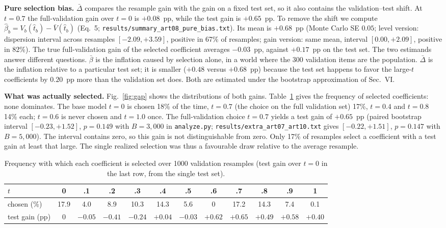 \documentclass[conference]{IEEEtran}
\begin{document}
\textbf{Pure selection bias.} $\bar\Delta$ compares the resample gain with the gain on a fixed test set, so it also contains the validation--test shift. At $t=0.7$ the full-validation gain over $t=0$ is $+0.08$~pp, while the test gain is $+0.65$~pp. To remove the shift we compute $\hat\beta_b=V_b(\hat t_b)-\bar V(\hat t_b)$ (Eq.~5; \texttt{results/summary\_art08\_pure\_bias.txt}). Its mean is $+0.68$~pp (Monte Carlo SE $0.05$; level version: dispersion interval across resamples $[-2.09,+3.59]$, positive in 67\% of resamples; gain version: same mean, interval $[0.00,+2.09]$, positive in 82\%). The true full-validation gain of the selected coefficient averages $-0.03$~pp, against $+0.17$~pp on the test set. The two estimands answer different questions. $\bar\beta$ is the inflation caused by selection alone, in a world where the 300 validation items are the population. $\bar\Delta$ is the inflation relative to a particular test set; it is smaller ($+0.48$ versus $+0.68$~pp) because the test set happens to favor the large-$t$ coefficients by $0.20$~pp more than the validation set does. Both are estimated under the bootstrap approximation of Sec.~VI.

\textbf{What was actually selected.} Fig.~\ref{fig:gap} shows the distributions of both gains. Table~\ref{tab:choice} gives the frequency of selected coefficients: none dominates. The base model $t=0$ is chosen 18\% of the time, $t=0.7$ (the choice on the full validation set) 17\%, $t=0.4$ and $t=0.8$ 14\% each; $t=0.6$ is never chosen and $t=1.0$ once. The full-validation choice $t=0.7$ yields a test gain of $+0.65$~pp (paired bootstrap interval $[-0.23,+1.52]$, $p=0.149$ with $B=3{,}000$ in \texttt{analyze.py}; \texttt{results/extra\_art07\_art10.txt} gives $[-0.22,+1.51]$, $p=0.147$ with $B=5{,}000$). The interval contains zero, so this gain is not distinguishable from zero. Only 17\% of resamples select a coefficient with a test gain at least that large. The single realized selection was thus a favourable draw relative to the average resample.

\begin{table}[!t]
\caption{Frequency with which each coefficient is selected over 1000 validation resamples (test gain over $t=0$ in the last row, from the single test set).}
\label{tab:choice}
\centering\small
\setlength{\tabcolsep}{4pt}
\begin{tabular}{lccccccccccc}
\toprule
$t$ & 0 & .1 & .2 & .3 & .4 & .5 & .6 & .7 & .8 & .9 & 1 \\
\midrule
chosen (\%) & 17.9 & 4.0 & 8.9 & 10.3 & 14.3 & 5.6 & 0 & 17.2 & 14.3 & 7.4 & 0.1 \\
test gain (pp) & 0 & $-0.05$ & $-0.41$ & $-0.24$ & $+0.04$ & $-0.03$ & $+0.62$ & $+0.65$ & $+0.49$ & $+0.58$ & $+0.40$ \\
\bottomrule
\end{tabular}
\end{table}
\end{document}

